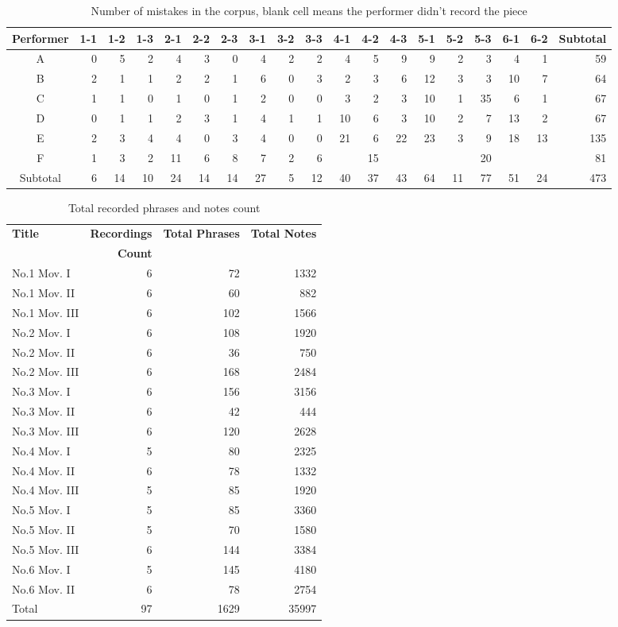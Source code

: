 \begin{table}
   \centering
   \caption{Number of mistakes in the corpus, blank cell means the performer didn't record the piece}
   \label{tab:mistakes}
   \begin{tabular}{c|rrrrrrrrrrrrrrrrr|r}
      \hline
      Performer&1-1&1-2&1-3&2-1&2-2&2-3&3-1&3-2&3-3&4-1&4-2&4-3&5-1&5-2&5-3&6-1&6-2&Subtotal\\
      \hline
      A&0&5&2&4&3&0&4&2&2&4&5&9&9&2&3&4&1&59\\
      B&2&1&1&2&2&1&6&0&3&2&3&6&12&3&3&10&7&64\\
      C&1&1&0&1&0&1&2&0&0&3&2&3&10&1&35&6&1&67\\
      D&0&1&1&2&3&1&4&1&1&10&6&3&10&2&7&13&2&67\\
      E&2&3&4&4&0&3&4&0&0&21&6&22&23&3&9&18&13&135\\
      F&1&3&2&11&6&8&7&2&6&&15&&&&20&&&81\\
      \hline
      Subtotal&6&14&10&24&14&14&27&5&12&40&37&43&64&11&77&51&24&473\\
   \end{tabular}
\end{table}
\begin{table}[bp]
   \centering
   \caption{Total recorded phrases and notes count}
   \label{tab:corpuscount}
   \begin{tabular}{l|rrr}
      \hline
      \bf Title&\bf Recordings&\bf Total Phrases&\bf Total Notes\\
      &\bf Count&&\\
      \hline
      No.1 Mov. I&6&72&1332\\
      No.1 Mov. II&6&60&882\\
      No.1 Mov. III&6&102&1566\\
      No.2 Mov. I&6&108&1920\\
      No.2 Mov. II&6&36&750\\
      No.2 Mov. III&6&168&2484\\
      No.3 Mov. I&6&156&3156\\
      No.3 Mov. II&6&42&444\\
      No.3 Mov. III&6&120&2628\\
      No.4 Mov. I&5&80&2325\\
      No.4 Mov. II&6&78&1332\\
      No.4 Mov. III&5&85&1920\\
      No.5 Mov. I&5&85&3360\\
      No.5 Mov. II&5&70&1580\\
      No.5 Mov. III&6&144&3384\\
      No.6 Mov. I&5&145&4180\\
      No.6 Mov. II&6&78&2754\\
      \hline
      Total&97&1629&35997\\
      \hline
   \end{tabular}
\end{table}

